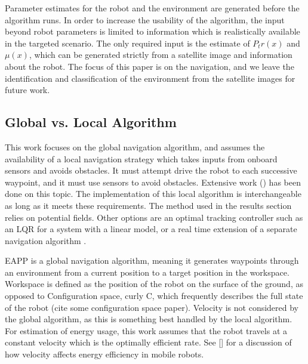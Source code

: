 \documentclass[journal]{IEEEtran}
\begin{document}
Parameter estimates for the robot and the environment are generated  before the algorithm runs. 
In order to increase the usability of the algorithm, the input beyond robot parameters is limited to information which is realistically available in the targeted scenario. 
The only required input is the estimate of $P_tr(x)$ and $\mu(x)$, which can be generated strictly from a satellite image and information about the robot. 
The focus of this paper is on the navigation, and we leave the identification and classification of the environment from the satellite images for future work.

\subsection{Global vs. Local Algorithm}
This work focuses on the global navigation algorithm, and assumes the availability of a local navigation strategy which takes inputs from onboard sensors and avoids obstacles. 
It must attempt drive the robot to each successive waypoint, and it must use sensors to avoid obstacles. 
Extensive work (\cite{examples}) has been done on this topic. 
The implementation of this local algorithm is interchangeable as long as it meets these requirements. The method used in the results section relies on potential fields. 
Other options are an optimal tracking controller such as an LQR for a system with a linear model, or a real time extension of a separate navigation algorithm \cite{(see Bruce- Real time RPP for Robot Navigation)}.

EAPP is a global navigation algorithm, meaning it generates waypoints through an environment from a current position to a target position in the workspace. 
Workspace is defined as the position of the robot on the surface of the ground, as opposed to Configuration space, curly C, which frequently describes the full state of the robot (cite some configuration space paper). 
Velocity is not considered by the global algorithm, as this is something best handled by the local algorithm. For estimation of energy usage, this work assumes that the robot travels at a constant velocity which is the optimally efficient rate. 
See [\cite{(Mei et al., Deployment of mobile robots with energy and timing constraints)}] for a discussion of how velocity affects energy efficiency in mobile robots.
\end{document}
